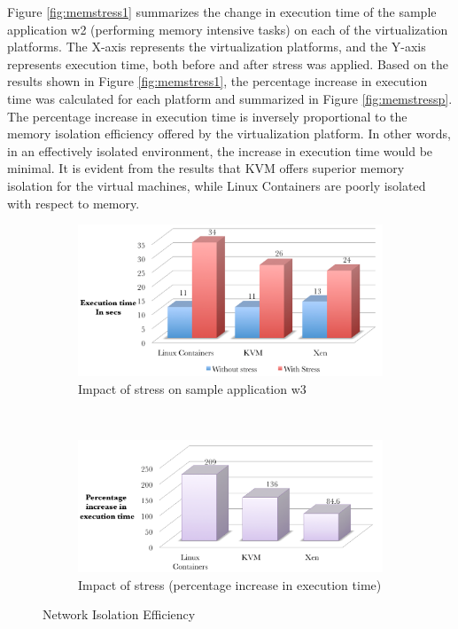Figure \ref{fig:memstress1} summarizes the change in execution time of the sample application w2 (performing memory intensive tasks) on each of the virtualization platforms. The X-axis represents the virtualization platforms, and the Y-axis represents execution time, both before and after stress was applied. Based on the results shown in Figure \ref{fig:memstress1}, the percentage increase in execution time was calculated for each platform and summarized in Figure \ref{fig:memstressp}. The percentage increase in execution time is inversely proportional to the memory isolation efficiency offered by the virtualization platform. In other words, in an effectively isolated environment, the increase in execution time would be minimal. It is evident from the results that KVM offers superior memory isolation for the virtual machines, while Linux Containers are poorly isolated with respect to memory.

\begin{figure}[H]
        \centering
        \begin{subfigure}[b]{0.99\textwidth}
                \includegraphics[width=\textwidth]{netstress.png}
                \caption{Impact of stress on sample application w3}
                \label{fig:netstress1}
        \end{subfigure}%
        ~ %
        \qquad \newline %
        \begin{subfigure}[b]{0.8\textwidth}
                \includegraphics[width=\textwidth]{netstressp.png}
                \caption{Impact of stress (percentage increase in execution time)}
                \label{fig:netstressp}
        \end{subfigure}
        \caption{Network Isolation Efficiency}\label{fig:netisolation}
\end{figure}


